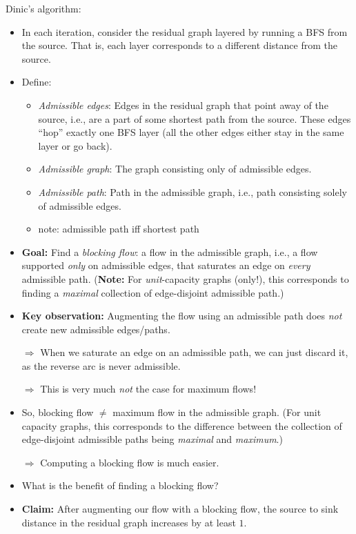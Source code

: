 \documentclass{article}
\begin{document}
Dinic's algorithm:
\begin{itemize}
\item In each iteration, consider the residual graph layered by running a BFS from the source. That is, each layer corresponds to a different distance from the source. 
\item Define:
\begin{itemize}
\item {\em Admissible edges}: Edges in the residual graph that point away of the source, i.e., are a part of some shortest path from the source. These edges ``hop'' exactly one BFS layer (all the other edges either stay in the same layer or go back).
\item {\em Admissible graph}:  The graph consisting only of admissible edges.
\item {\em Admissible path}: Path in the admissible graph, i.e., path consisting solely of admissible edges.
\item note: admissible path iff shortest path
\end{itemize}
\item \textbf{Goal:} Find a {\em blocking flow}: a flow in the admissible graph, i.e., a flow supported {\em only} on admissible edges, that saturates an edge on {\em every} admissible path. (\textbf{Note:} For {\em unit}-capacity graphs (only!), this corresponds to finding a {\em maximal} collection of edge-disjoint admissible path.)
\item \textbf{Key observation:} Augmenting the flow using an admissible path does {\em not} create new admissible edges/paths.

$\Rightarrow$ When we saturate an edge on an admissible path, we can just {discard} it, as the reverse arc is never admissible.

$\Rightarrow$ This is very much {\em not} the case for maximum flows!

\item So, blocking flow $\neq$ maximum flow in the admissible graph. 
(For unit capacity graphs, this corresponds to the difference between the collection of edge-disjoint admissible paths being {\em maximal} and {\em maximum}.)

$\Rightarrow$ Computing a blocking flow is much easier. 

\item What is the benefit of finding a blocking flow?

\item \textbf{Claim:} After augmenting our flow with a blocking flow, the source to sink distance in the residual graph increases by at least $1$.


\end{itemize}
\end{document}
